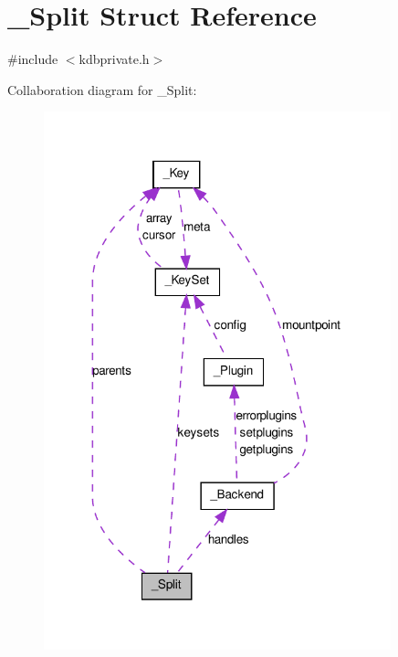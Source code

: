 \hypertarget{struct__Split}{
\section{\_\-Split Struct Reference}
\label{struct__Split}
}


{\ttfamily \#include $<$kdbprivate.h$>$}



Collaboration diagram for \_\-Split:
\nopagebreak
\begin{figure}[H]
\begin{center}
\leavevmode
\includegraphics[width=285pt]{struct__Split__coll__graph}
\end{center}
\end{figure}

